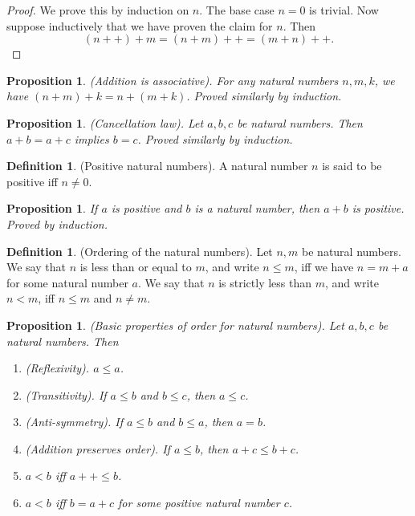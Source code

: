 \documentclass[12pt]{article}
\newtheorem{proposition}[theorem]{Proposition}
\theoremstyle{definition}
\newtheorem{definition}[theorem]{Definition}
\theoremstyle{remark}
\begin{document}
\begin{proof}
    We prove this by induction on $n$. The base case $n = 0$ is trivial. Now suppose inductively that we have proven the claim for $n$. Then \[
        (n++) + m = (n + m)++ = (m + n)++
    .\]
\end{proof}

\begin{proposition}
    (Addition is associative). For any natural numbers $n,m,k$, we have $(n + m) + k = n + (m + k)$. Proved similarly by induction.
\end{proposition}

\begin{proposition}
    (Cancellation law). Let $a,b,c$ be natural numbers. Then $a + b = a + c$ implies $b = c$. Proved similarly by induction.
\end{proposition}

\begin{definition}
    (Positive natural numbers). A natural number $n$ is said to be positive iff $n \neq 0$.
\end{definition}

\begin{proposition}
    If $a$ is positive and $b$ is a natural number, then $a + b$ is positive. Proved by induction.
\end{proposition}

\begin{definition}
    (Ordering of the natural numbers). Let $n,m$ be natural numbers. We say that $n$ is less than or equal to $m$, and write $n \leq m$, iff we have $n = m + a$ for some natural number $a$. We say that $n$ is strictly less than $m$, and write $n < m$, iff $n \leq m$ and $n \neq m$.
\end{definition}

\begin{proposition}
    (Basic properties of order for natural numbers). Let $a, b, c$ be natural numbers. Then
    \begin{enumerate}
        \item (Reflexivity). $a \leq a$.
        \item (Transitivity). If $a \leq b$ and $b \leq c$, then $a \leq c$.
        \item (Anti-symmetry). If $a \leq b$ and $b \leq a$, then $a = b$.
        \item (Addition preserves order). If $a \leq b$, then $a + c \leq b + c$.
        \item $a < b$ iff $a++ \leq b$.
        \item $a < b$ iff $b = a + c$ for some positive natural number $c$.
    \end{enumerate}
\end{proposition}
\end{document}
